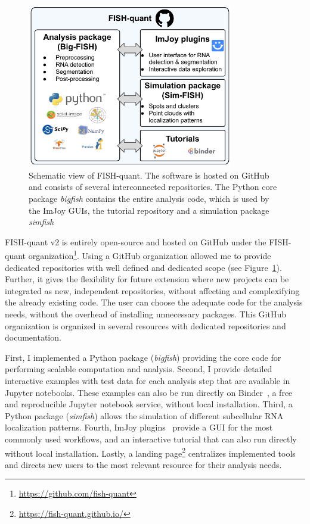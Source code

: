 \begin{figure}[]
    \centering
    \includegraphics[width=0.8\textwidth]{figures/chapter1/schema_fishquant}
    \caption[Schematic view of FISH-quant]{Schematic view of FISH-quant.
	The software is hosted on GitHub and consists of several interconnected repositories.
	The Python core package \emph{bigfish} contains the entire analysis code, which is used by the ImJoy GUIs, the tutorial repository and a simulation package \emph{simfish}}
    \label{fig:fishquant}
\end{figure}

FISH-quant v2 is entirely open-source and hosted on GitHub under the FISH-quant organization\footnote{\url{https://github.com/fish-quant}}.
Using a GitHub organization allowed me to provide dedicated repositories with well defined and dedicated scope (see Figure~\ref{fig:fishquant}).
Further, it gives the flexibility for future extension where new projects can be integrated as new, independent repositories, without affecting and complexifying the already existing code.
The user can choose the adequate code for the analysis needs, without the overhead of installing unnecessary packages.
This GitHub organization is organized in several resources with dedicated repositories and documentation.

First, I implemented a Python package (\emph{bigfish}) providing the core code for performing scalable computation and analysis.
Second, I provide detailed interactive examples with test data for each analysis step that are available in Jupyter notebooks.
These examples can also be run directly on Binder~\cite{Jupyter2018Binder2}, a free and reproducible Jupyter notebook service, without local installation.
Third, a Python package (\emph{simfish}) allows the simulation of different subcellular \ac{RNA} localization patterns.
Fourth, ImJoy plugins~\cite{ouyang_imjoy_2019} provide a \ac{GUI} for the most commonly used workflows, and an interactive tutorial that can also run directly without local installation.
Lastly, a landing page\footnote{\url{https://fish-quant.github.io/}} centralizes implemented tools and directs new users to the most relevant resource for their analysis needs.

